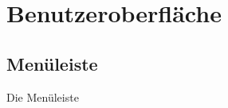 \chapter{Benutzeroberfläche}
\label{ch:benutzeroberfläche}

\section{Menüleiste}
\label{sec:menüleiste}

Die Menüleiste
